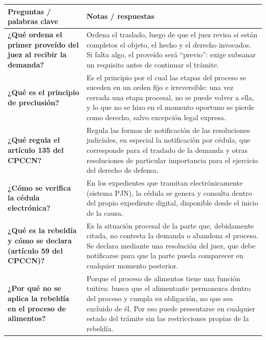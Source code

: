\documentclass[12pt,oneside]{book}
\newcommand{\cornellL}{0.27\textwidth}
\newcommand{\cornellR}{0.63\textwidth}
\begin{document}
\begin{longtable}{@{}>{\raggedright\arraybackslash}p{\cornellL}@{\hspace{1em}}>{\raggedright\arraybackslash}p{\cornellR}@{}}
\toprule
\textbf{Preguntas / palabras clave} & \textbf{Notas / respuestas} \\
\midrule
\endhead
\bottomrule
\endfoot

\textbf{¿Qu\'e ordena el primer prove\'ido del juez al recibir la demanda?} &
Ordena el traslado, luego de que el juez revisa si est\'an completos el objeto, el hecho y el derecho invocados. Si falta algo, el prove\'ido ser\'a ``previo'': exige subsanar un requisito antes de continuar el tr\'amite. \\[0.8em]

\textbf{¿Qu\'e es el principio de preclusi\'on?} &
Es el principio por el cual las etapas del proceso se suceden en un orden fijo e irreversible: una vez cerrada una etapa procesal, no se puede volver a ella, y lo que no se hizo en el momento oportuno se pierde como derecho, salvo excepci\'on legal expresa. \\[0.8em]

\textbf{¿Qu\'e regula el art\'iculo 135 del CPCCN?} &
Regula las formas de notificaci\'on de las resoluciones judiciales, en especial la notificaci\'on por c\'edula, que corresponde para el traslado de la demanda y otras resoluciones de particular importancia para el ejercicio del derecho de defensa. \\[0.8em]

\textbf{¿C\'omo se verifica la c\'edula electr\'onica?} &
En los expedientes que tramitan electr\'onicamente (sistema PJN), la c\'edula se genera y consulta dentro del propio expediente digital, disponible desde el inicio de la causa. \\[0.8em]

\textbf{¿Qu\'e es la rebeld\'ia y c\'omo se declara (art\'iculo 59 del CPCCN)?} &
Es la situaci\'on procesal de la parte que, debidamente citada, no contesta la demanda o abandona el proceso. Se declara mediante una resoluci\'on del juez, que debe notificarse para que la parte pueda comparecer en cualquier momento posterior. \\[0.8em]

\textbf{¿Por qu\'e no se aplica la rebeld\'ia en el proceso de alimentos?} &
Porque el proceso de alimentos tiene una funci\'on tuitiva: busca que el alimentante permanezca dentro del proceso y cumpla su obligaci\'on, no que sea excluido de \'el. Por eso puede presentarse en cualquier estado del tr\'amite sin las restricciones propias de la rebeld\'ia. \\[0.8em]


\end{longtable}
\end{document}
